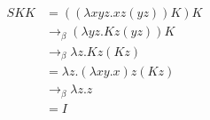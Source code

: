 \documentclass {article}
\begin{document}
\begin{align*}
S K K 
&= ((\lambda x y z. x z (y z)) K) K \\
&\to_\beta (\lambda y z. K z (y z)) K \\
&\to_\beta \lambda z. K z (K z) \\
&= \lambda z. (\lambda x y. x) z (K z) \\
&\to_\beta \lambda z. z \\
&= I
\end{align*}
\end{document}
